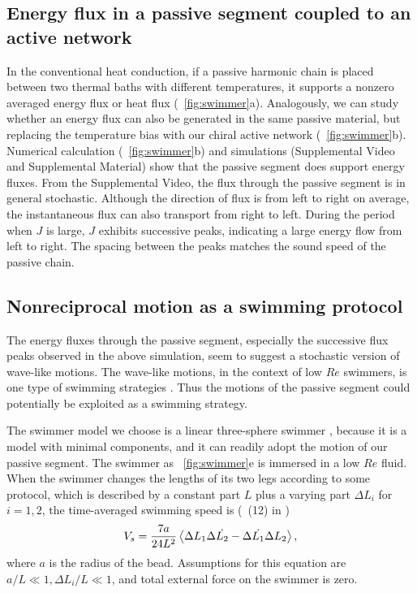 \documentclass[
 preprint,
 preprintnumbers,
 amsmath,amssymb,
 aps,
 pre,
 longbibliography,
 superscriptaddress,
 10pt, twocolumn
]{revtex4-1}
\begin{document}
\subsection{Energy flux in a passive segment coupled to an active network}
In the conventional heat conduction, if a passive harmonic chain is placed between two thermal baths with different temperatures, it supports a nonzero averaged energy flux or heat flux (\figurename~\ref{fig:swimmer}a).
Analogously, we can study whether an energy flux can also be generated in the same passive material, but replacing the temperature bias with our chiral active network (\figurename~\ref{fig:swimmer}b).
Numerical calculation (\figurename~\ref{fig:swimmer}b) and simulations (Supplemental Video and Supplemental Material) show that the passive segment does support energy fluxes.
From the Supplemental Video, the flux through the passive segment is in general stochastic. Although the direction of flux is from left to right on average, the instantaneous flux can also transport from right to left. During the period when $J$ is large, $J$ exhibits successive peaks, indicating a large energy flow from left to right. The spacing between the peaks matches the sound speed of the passive chain.


\subsection{Nonreciprocal motion as a swimming protocol}
The energy fluxes through the passive segment, especially the successive flux peaks observed in the above simulation, seem to suggest a stochastic version of wave-like motions. The wave-like motions, in the context of low $Re$ swimmers, is one type of swimming strategies \cite{Taylor1951AnalysisSwimming,Golestanian2008AnalyticResults}. Thus the motions of the passive segment could potentially be exploited as a swimming strategy.

The swimmer model we choose is a linear three-sphere swimmer \cite{Golestanian2008AnalyticResults}, because it is a model with minimal components, and it can readily adopt the motion of our passive segment. The swimmer as \figurename~\ref{fig:swimmer}e is immersed in a low $Re$ fluid. When the swimmer changes the lengths of its two legs according to some protocol, which is described by a constant part $L$ plus a varying part $\Delta L_i$ for $i=1,2$, the time-averaged swimming speed is (\eqnname~(12) in \cite{Golestanian2008AnalyticResults})
\begin{equation} \label{eqn:swimmer_speed}
    V_s = \frac{7a}{24L^2} \expval{\Delta L_1 \Delta \Dot{L_2} - \Delta \Dot{L_1} \Delta{L_2}},
\end{equation}
where $a$ is the radius of the bead. Assumptions for this equation are $a/L \ll 1, \Delta L_i/L \ll 1$, and total external force on the swimmer is zero.
\end{document}

